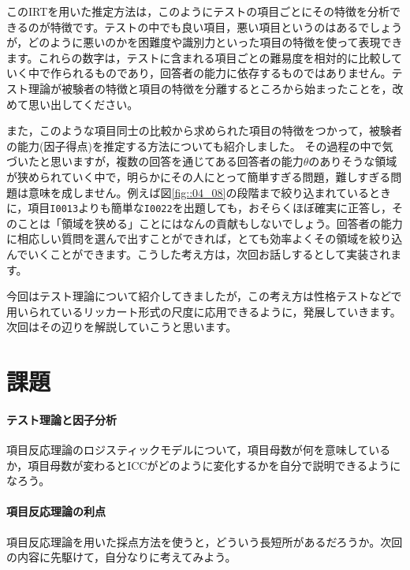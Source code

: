 \documentclass{ltjsbook}
\begin{document}
このIRTを用いた推定方法は，このようにテストの項目ごとにその特徴を分析できるのが特徴です。テストの中でも良い項目，悪い項目というのはあるでしょうが，どのように悪いのかを困難度や識別力といった項目の特徴を使って表現できます。これらの数字は，テストに含まれる項目ごとの難易度を相対的に比較していく中で作られるものであり，回答者の能力に依存するものではありません。テスト理論が被験者の特徴と項目の特徴を分離するところから始まったことを，改めて思い出してください。

また，このような項目同士の比較から求められた項目の特徴をつかって，被験者の能力(因子得点)を推定する方法についても紹介しました。
その過程の中で気づいたと思いますが，複数の回答を通じてある回答者の能力$\theta$のありそうな領域が狭められていく中で，明らかにその人にとって簡単すぎる問題，難しすぎる問題は意味を成しません。例えば図\ref{fig::04_08}の段階まで絞り込まれているときに，項目\texttt{I0013}よりも簡単な\texttt{I0022}を出題しても，おそらくほぼ確実に正答し，そのことは「領域を狭める」ことにはなんの貢献もしないでしょう。回答者の能力に相応しい質問を選んで出すことができれば，とても効率よくその領域を絞り込んでいくことができます。こうした考え方は，次回お話しするとして実装されます。

今回はテスト理論について紹介してきましたが，この考え方は性格テストなどで用いられているリッカート形式の尺度に応用できるように，発展していきます。次回はその辺りを解説していこうと思います。

\section{課題}
\paragraph{テスト理論と因子分析} 項目反応理論のロジスティックモデルについて，項目母数が何を意味しているか，項目母数が変わるとICCがどのように変化するかを自分で説明できるようになろう。
\paragraph{項目反応理論の利点} 項目反応理論を用いた採点方法を使うと，どういう長短所があるだろうか。次回の内容に先駆けて，自分なりに考えてみよう。
\end{document}
